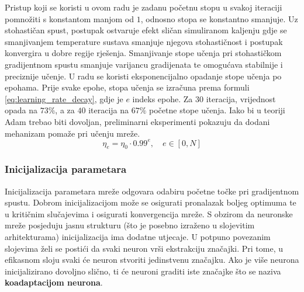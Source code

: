 \documentclass[times, utf8, numeric, diplomski]{fer}
\def\TODO#1{\noindent\textcolor{red}{TODO: \textit{#1}}\newline}
\def\todo#1{\TODO{#1}}
\begin{document}


Pristup koji se koristi u ovom radu je zadanu početnu stopu u svakoj iteraciji pomnožiti s konstantom manjom od $1$, odnosno stopa se konstantno smanjuje. Uz stohastičan spust, postupak ostvaruje efekt sličan simuliranom kaljenju gdje se smanjivanjem temperature sustava smanjuje njegova stohastičnost i postupak konvergira u dobre regije rješenja. Smanjivanje stope učenja pri stohastičkom gradijentnom spustu smanjuje varijancu gradijenata te omogućava stabilnije i preciznije učenje. U radu se koristi eksponencijalno opadanje stope učenja po epohama. Prije svake epohe, stopa učenja se izračuna prema formuli \eqref{eq:learning_rate_decay}, gdje je $e$ indeks epohe. Za $30$ iteracija, vrijednost opada na $73\%$, a za $40$ iteracija na $67\%$ početne stope učenja. Iako bi u teoriji Adam trebao biti dovoljan, preliminarni eksperimenti pokazuju da dodani mehanizam pomaže pri učenju mreže.
\begin{equation}
\label{eq:learning_rate_decay}
\eta_e = \eta_0 \cdot 0.99^e,\quad e \in [0, N]
\end{equation}

\subsubsection{Inicijalizacija parametara}
Inicijalizacija parametara mreže odgovara odabiru početne točke pri gradijentnom spustu. Dobrom inicijalizacijom može se osigurati pronalazak boljeg optimuma te u kritičnim slučajevima i osigurati konvergencija mreže. S obzirom da neuronske mreže posjeduju jasnu strukturu (što je posebno izraženo u slojevitim arhitekturama) inicijalizacija ima dodatne utjecaje. U potpuno povezanim slojevima želi se postići da svaki neuron vrši ekstrakciju značajki. Pri tome, u efikasnom sloju svaki će neuron stvoriti jedinstvenu značajku. Ako je više neurona inicijalizirano dovoljno slično, ti će neuroni graditi iste značajke što se naziva \textbf{koadaptacijom neurona}.
\end{document}
